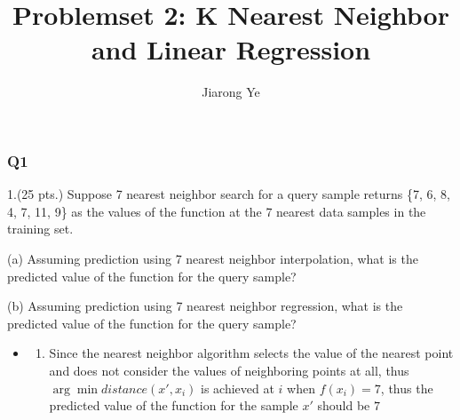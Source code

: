 \documentclass[11pt]{article}
\title{Problemset 2: K Nearest Neighbor and Linear
Regression}
\author{Jiarong Ye}
\providecommand{\tightlist}{%
      \setlength{\itemsep}{0pt}\setlength{\parskip}{0pt}}
\begin{document}
    
    
    \maketitle
    
    

    \subsubsection*{Q1}\label{q1}

    1.(25 pts.) Suppose 7 nearest neighbor search for a query sample returns
\{7, 6, 8, 4, 7, 11, 9\} as the values of the function at the 7 nearest
data samples in the training set.

(a) Assuming prediction using 7 nearest neighbor interpolation, what is
    the predicted value of the function for the query sample?

(b) Assuming prediction using 7 nearest neighbor regression, what is the
    predicted value of the function for the query sample?


    \begin{itemize}
\item
  \begin{enumerate}
  \def\labelenumi{(\alph{enumi})}
  \tightlist
  \item
    Since the nearest neighbor algorithm selects the value of the
    nearest point and does not consider the values of neighboring points
    at all, thus \(\arg \min distance(x', x_i)\) is achieved at \(i\)
    when \(f(x_i)=7\), thus the predicted value of the function for the
    sample \(x'\) should be \(7\)
  \end{enumerate}
\end{itemize}
\end{document}
